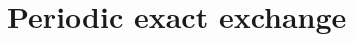 \documentclass[prb,aps,nobibnotes,twocolumn,doublespace,twocolumngrid,superbib]{revtex4}
\begin{document}
%


\section{Periodic exact exchange}
\end{document}
